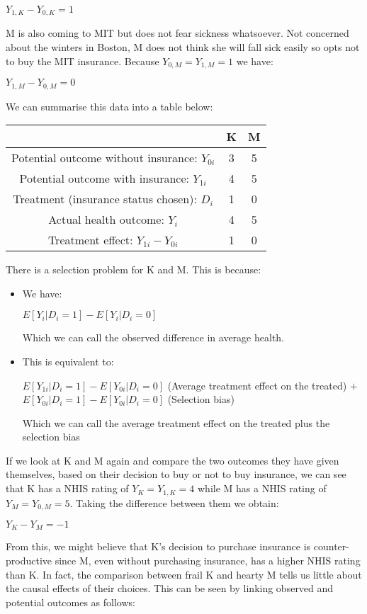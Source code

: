 \documentclass[12pt, letterpaper]{article}
\begin{document}
{\begin{center}
	$Y_{1,K} - Y_{0,K} = 1$
\end{center}
M is also coming to MIT but does not fear sickness whatsoever. Not concerned about the winters in Boston, M does not think she will fall sick easily so opts not to buy the MIT insurance. Because $Y_{0,M} = Y_{1,M} = 1$ we have:
\begin{center}
	$Y_{1,M} - Y_{0,M} = 0$
\end{center}
We can summarise this data into a table below:
\begin{center}
	\begin{tabular}{ccc}
	\hline
	\hline
	& K & M\\
	\hline
	Potential outcome without insurance: $Y_{0i}$ & 3 & 5\\
	Potential outcome with insurance: $Y_{1i}$ & 4 & 5\\
	Treatment (insurance status chosen): $D_i$ & 1 & 0\\
	Actual health outcome: $Y_i$ & 4 & 5\\
	Treatment effect: $Y_{1i} - Y_{0i}$ & 1 & 0\\
	\hline 
	\end{tabular}
\end{center}
There is a selection problem for K and M. This is because:
\begin{itemize}
	\item We have: 
	\begin{center}
	$E[Y_i|D_i=1]-E[Y_i|D_i=0]$ 
	\end{center}
	Which we can call the observed difference in average health.
	\item This is equivalent to:
	\begin{center}
	$E[Y_{1i}|D_i=1]-E[Y_{0i}|D_i=0]$ (Average treatment effect on the treated) $+$ $E[Y_{0i}|D_i=1]-E[Y_{0i}|D_i=0]$ (Selection bias)
	\end{center}
	Which we can call the average treatment effect on the treated plus the selection bias
\end{itemize}
If we look at K and M again and compare the two outcomes they have given themselves, based on their decision to buy or not to buy insurance, we can see that K has a NHIS rating of $Y_K = Y_{1,K} = 4$ while M has a NHIS rating of $Y_M = Y_{0,M} = 5$. Taking the difference between them we obtain:
\begin{center}
	$Y_K - Y_M = -1$
\end{center}
From this, we might believe that K's decision to purchase insurance is counter-productive since M, even without purchasing insurance, has a higher NHIS rating than K. In fact, the comparison between frail K and hearty M tells us little about the causal effects of their choices. This can be seen by linking observed and potential outcomes as follows:
}
\end{document}
